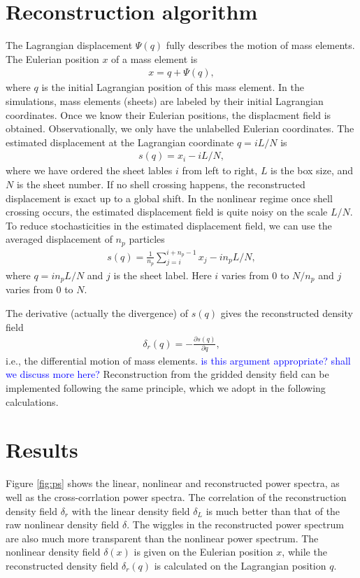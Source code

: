 \documentclass[aps,prd,twocolumn,showpacs,superscriptaddress,groupedaddress,nofootinbib]{revtex4}  %
\newcommand{\tcb}{\textcolor{blue}}
\newcommand{\bea}{\begin{eqnarray}}
\newcommand{\eea}{\end{eqnarray}}
\begin{document}
\section{Reconstruction algorithm}
The Lagrangian displacement 
${\Psi}({q})$ fully describes the motion of mass elements.
The Eulerian position ${x}$ of a mass element is
\bea
{x}={q}+{\Psi}({q}),
\eea
where ${q}$ is the initial Lagrangian position of this mass element.
In the simulations, mass elements (sheets) are labeled by their initial 
Lagrangian coordinates. Once we know their Eulerian positions, the displacment 
field is obtained. Observationally, we only have the unlabelled Eulerian 
coordinates. 
The estimated displacement at the Lagrangian coordinate $q=iL/N$ is 
\bea
s(q)=x_i-iL/N,
\eea
where we have ordered the sheet lables $i$ from left to right, $L$ is the box
size, and $N$ is the sheet number. 
If no shell crossing happens, the reconstructed displacement is exact up to
a global shift. In the nonlinear regime once shell crossing occurs, the 
estimated displacement field is quite noisy on the scale $L/N$.
To reduce stochasticities in the estimated displacement field, we can use the
averaged displacement of $n_p$ particles 
\bea
s(q)=\frac{1}{n_p}\sum_{j=i}^{i+n_p-1}x_{j}-in_pL/N,
\eea
where $q=in_pL/N$ and $j$ is the sheet label. 
Here $i$ varies from $0$ to $N/n_p$ and $j$ varies from $0$ to $N$.

The derivative (actually the divergence) of $s(q)$ gives the reconstructed 
density field 
\bea
\delta_r({q})=-\frac{\partial s(q)}{\partial q},
\eea
i.e., the differential
motion of mass elements. \tcb{is this argument appropriate? shall we discuss 
more here?}
Reconstruction from the gridded density field can be implemented following
the same principle, which we adopt in the following calculations.


\section{Results}
Figure \ref{fig:ps} shows the linear, nonlinear and reconstructed power spectra,
as well as the cross-corrlation power spectra.
The correlation of the reconstruction density field $\delta_r$ with the linear
density field $\delta_L$ is much better than that of the raw nonlinear density 
field $\delta$. The wiggles in the reconstructed power spectrum are also much 
more transparent than the nonlinear power spectrum.
The nonlinear density field $\delta(x)$ is given on the Eulerian position $x$,
while the reconstructed density field $\delta_r(q)$ is calculated on the 
Lagrangian position $q$. 
\end{document}
